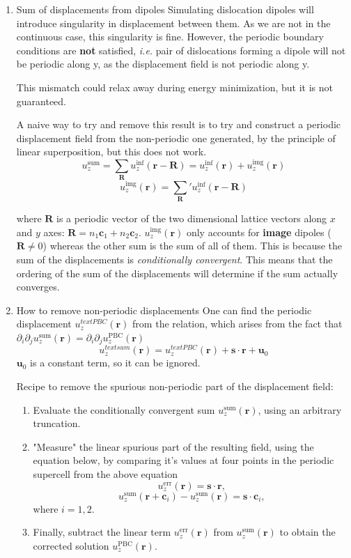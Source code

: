 \documentclass[11pt]{article}
\begin{document}
\begin{enumerate}
\item Sum of displacements from dipoles
\label{sec:orgf63361d}
Simulating dislocation dipoles will introduce singularity in displacement
between them. As we are not in the continuous case, this singularity is
fine. However, the periodic boundary conditions are \textbf{not} satisfied,
\emph{i.e.} pair of dislocations forming a dipole will not be periodic
along y, as the displacement field is not periodic along y. 

This mismatch could relax away during energy minimization, but it is not
guaranteed. 

A naive way to try and remove this result is to try and construct a
periodic displacement field from the non-periodic one generated, by the
principle of linear superposition, but this does not work. 
\[ u_{z}^{\text{sum}} = \sum_{\mathbf{R}} u_{z}^{\inf}(\mathbf{r}
     -\mathbf{R}) = u_{z}^{\inf}(\mathbf{r}) + u_{z}^{\text{img}}(\mathbf{r})
     \]
\[  u_{z}^{\text{img}}(\mathbf{r}) = \sum_{\mathbf{R}}' u_{z}^{\inf}(\mathbf{r}
     -\mathbf{R}) \]

where \(\mathbf{R}\) is a periodic vector of the two dimensional lattice
vectors along \(x\) and \(y\) axes: \(\mathbf{R} = n_{1}\mathbf{c}_1 +
     n_{2}\mathbf{c}_2\).
\(u_{z}^{\text{img}}(\mathbf{r})\) only accounts for \textbf{image} dipoles
(\(\mathbf{R}\neq 0\))
whereas the other sum is the sum of all of them. 
This is because the sum of the displacements is \emph{conditionally
convergent}. This means that the ordering of the sum of the displacements
will determine if the sum actually converges.

\item How to remove non-periodic displacements
\label{sec:orga043d02}
One can find the periodic displacement \(u_{z}^{text{PBC}}(\mathbf{r})\)
from the relation, which arises from the fact that
\(\partial_{i}\partial_{j}u_{z}^{\text{sum}}(\mathbf{r}) = \partial_{i}\partial_{j}u_{z}^{\text{PBC}}(\mathbf{r})\)
\[ u_{z}^{text{sum}}(\mathbf{r}) =  u_{z}^{text{PBC}}(\mathbf{r}) +
     \mathbf{s}\cdot\mathbf{r} + \mathbf{u}_{0} \]
\(\mathbf{u}_{0}\) is a constant term, so it can be ignored. 

Recipe to remove the spurious non-periodic part of the displacement field:
\begin{enumerate}
\item Evaluate the conditionally convergent sum
\(u_{z}^{\text{sum}}(\mathbf{r})\), using an arbitrary truncation.
\item "Measure" the linear spurious part of the resulting field, using the
equation below, by comparing it's values at four points in the
periodic supercell from the above equation 
\[ u_{z}^{\text{err}}(\mathbf{r}) =  \mathbf{s}\cdot\mathbf{r},  \]
\[ u_{z}^{\text{sum}}(\mathbf{r} + \mathbf{c}_{i})  -
        u_{z}^{\text{sum}}(\mathbf{r}) = \mathbf{s}\cdot\mathbf{c}_{i}, \]
where \(i=1,2\).
\item Finally, subtract the linear term \(u_{z}^{\text{err}}(\mathbf{r})\) from
\(u_{z}^{\text{sum}}(\mathbf{r})\) to obtain the corrected solution
\(u_{z}^{\text{PBC}}(\mathbf{r})\).
\end{enumerate}



\end{enumerate}
\end{document}
